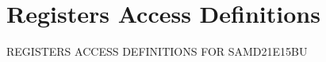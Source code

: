 \hypertarget{group___s_a_m_d21_e15_b_u__reg}{}\section{Registers Access Definitions}
\label{group___s_a_m_d21_e15_b_u__reg}
R\+E\+G\+I\+S\+T\+E\+RS A\+C\+C\+E\+SS D\+E\+F\+I\+N\+I\+T\+I\+O\+NS F\+OR S\+A\+M\+D21\+E15\+BU 